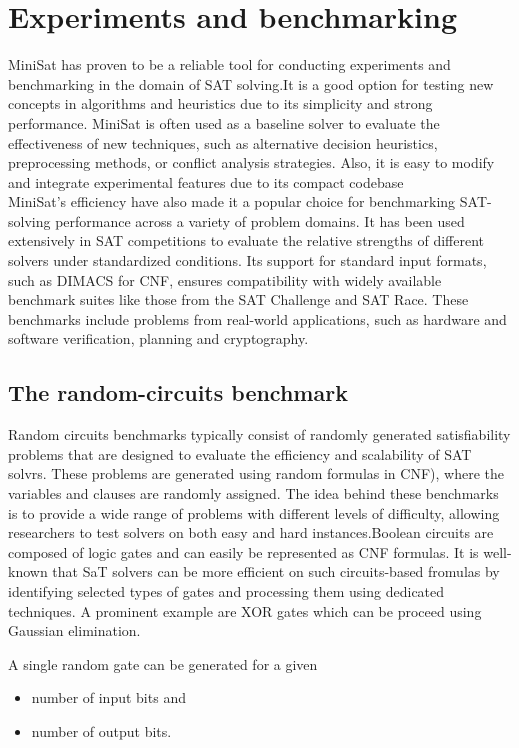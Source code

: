 \documentclass[runningheads]{llncs}
\begin{document}
\section{Experiments and benchmarking}
MiniSat has proven to be a reliable tool for conducting experiments and benchmarking in the domain of SAT solving.It is a good option for testing new concepts in algorithms and heuristics due to its simplicity and strong performance. MiniSat is  often used as a baseline solver to evaluate the effectiveness of new techniques, such as alternative decision heuristics, preprocessing methods, or conflict analysis strategies. Also, it is easy to modify and integrate experimental features due to its compact codebase
\\
MiniSat's efficiency have also made it a popular choice for benchmarking SAT-solving performance across a variety of problem domains. It has been used extensively in SAT competitions to evaluate the relative strengths of different solvers under standardized conditions. Its support for standard input formats, such as DIMACS for CNF, ensures compatibility with widely available benchmark suites like those from the SAT Challenge and SAT Race. These benchmarks include problems from real-world applications, such as hardware and software verification, planning and cryptography.
\subsection{The random-circuits benchmark}

Random circuits benchmarks typically consist of randomly generated satisfiability problems that are designed to evaluate the efficiency and scalability of SAT solvrs. These problems are generated using random formulas in CNF), where the variables and clauses are randomly assigned. The idea behind these benchmarks is to provide a wide range of problems with different levels of difficulty, allowing researchers to test solvers on both easy and hard instances.Boolean circuits are composed of logic gates and can easily be represented as CNF formulas. It is well-known that SaT solvers can be more efficient on such circuits-based fromulas by identifying selected types of gates and processing them using dedicated techniques. A prominent example are XOR gates which can be proceed using Gaussian elimination. 

A single random gate can be generated for a given 

\begin{itemize}
  \item number of input bits and
  \item number of output bits.
\end{itemize}
\end{document}
